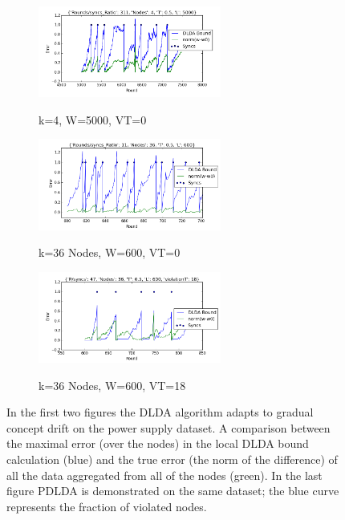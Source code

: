 \documentclass[11pt,twocolumn,varwidth=true,a4paper,fleqn]{article}
\begin{document}
\begin{figure}[h!]

  
  \begin{subfigure}
  \centering
  \includegraphics[width=6cm]{PowerSupply/4nodes.png} 
  \label{PowerSupplyFigure1}
  \caption{k=4, W=5000, VT=0}
  \end{subfigure}
  
  \begin{subfigure}
  \centering
  \includegraphics[width=6cm]{PowerSupply/36nodes.png}
  \label{PowerSupplyFigure2}
  \caption{k=36 Nodes, W=600, VT=0}
  \end{subfigure}
  
  \begin{subfigure}  
  \centering
  \includegraphics[width=6cm]{PowerSupply/36nodesProb.png}
  \label{PowerSupplyFigure3}
  \caption{k=36 Nodes, W=600, VT=18}
  \end{subfigure}
  \caption{In the first two figures the DLDA algorithm adapts
  to gradual concept drift on the power supply dataset.  
  A comparison between the maximal error (over the nodes) in the 
  local DLDA bound calculation (blue) and the true
error (the norm of the difference) of all the data aggregated from
all of the nodes (green). In the last figure PDLDA
is demonstrated on the same dataset; the blue curve represents the
fraction of violated nodes.}
\label{PowerSupplyFigures}
\end{figure}
\end{document}
